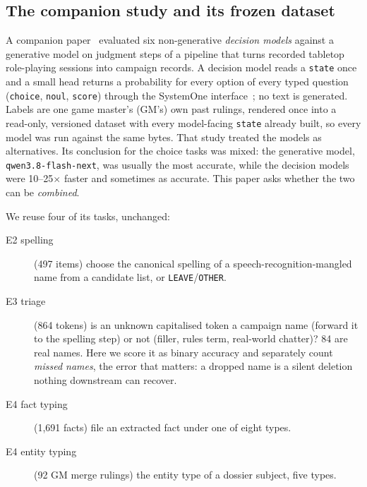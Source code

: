 \documentclass[11pt]{article}
\begin{document}
\subsection{The companion study and its frozen dataset}
A companion paper~\cite{companion} evaluated six non-generative \emph{decision models} against a
generative model on judgment steps of a pipeline that turns recorded tabletop role-playing sessions
into campaign records. A decision model reads a \texttt{state} once and a small head returns a
probability for every option of every typed question (\texttt{choice}, \texttt{noul},
\texttt{score}) through the SystemOne interface~\cite{typesafe}; no text is generated. Labels are one
game master's (GM's) own past rulings, rendered once into a read-only, versioned dataset with every
model-facing \texttt{state} already built, so every model was run against the same bytes.
That study treated the models as alternatives. Its conclusion for the choice tasks was mixed: the
generative model, \texttt{qwen3.8-flash-next}, was usually the most accurate, while the decision
models were 10--25$\times$ faster and sometimes as accurate. This paper asks whether the two can be
\emph{combined}.

We reuse four of its tasks, unchanged:
\begin{description}
  \item[E2 spelling] (497 items) choose the canonical spelling of a speech-recognition-mangled name
        from a candidate list, or \texttt{LEAVE}/\texttt{OTHER}.
  \item[E3 triage] (864 tokens) is an unknown capitalised token a campaign name (forward it to the
        spelling step) or not (filler, rules term, real-world chatter)? 84 are real names. Here we
        score it as binary accuracy and separately count \emph{missed names}, the error that
        matters: a dropped name is a silent deletion nothing downstream can recover.
  \item[E4 fact typing] (1{,}691 facts) file an extracted fact under one of eight types.
  \item[E4 entity typing] (92 GM merge rulings) the entity type of a dossier subject, five types.
\end{description}
\end{document}
